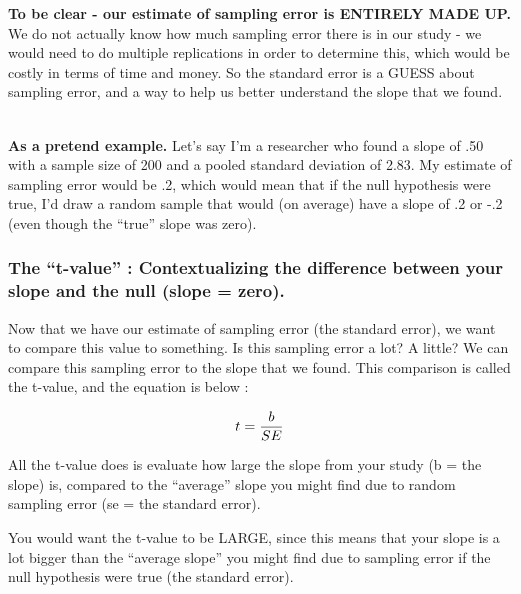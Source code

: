 \documentclass[
  letterpaper,
  DIV=11,
  numbers=noendperiod,
  oneside]{scrreprt}
\begin{document}
\textbf{To be clear - our estimate of sampling error is ENTIRELY MADE
UP.} We do not actually know how much sampling error there is in our
study - we would need to do multiple replications in order to determine
this, which would be costly in terms of time and money. So the standard
error is a GUESS about sampling error, and a way to help us better
understand the slope that we found.\\
\strut \\
\textbf{As a pretend example.} Let's say I'm a researcher who found a
slope of .50 with a sample size of 200 and a pooled standard deviation
of 2.83. My estimate of sampling error would be .2, which would mean
that if the null hypothesis were true, I'd draw a random sample that
would (on average) have a slope of .2 or -.2 (even though the ``true''
slope was zero).

\subsubsection{\texorpdfstring{\textbf{The ``t-value'' : Contextualizing
the difference between your slope and the null (slope =
zero).}}{The ``t-value'' : Contextualizing the difference between your slope and the null (slope = zero).}}\label{the-t-value-contextualizing-the-difference-between-your-slope-and-the-null-slope-zero.}

Now that we have our estimate of sampling error (the standard error), we
want to compare this value to something. Is this sampling error a lot? A
little? We can compare this sampling error to the slope that we found.
This comparison is called the t-value, and the equation is below :~

\[
\huge t = \frac{b}{SE}
\]

All the t-value does is evaluate how large the slope from your study (b
= the slope) is, compared to the ``average'' slope you might find due to
random sampling error (se = the standard error).~

\begin{tcolorbox}[enhanced jigsaw, toptitle=1mm, toprule=.15mm, rightrule=.15mm, breakable, left=2mm, colbacktitle=quarto-callout-tip-color!10!white, colback=white, opacityback=0, coltitle=black, bottomtitle=1mm, opacitybacktitle=0.6, titlerule=0mm, leftrule=.75mm, arc=.35mm, bottomrule=.15mm, title=\textcolor{quarto-callout-tip-color}{\faLightbulb}\hspace{0.5em}{Pop Quiz. As a researcher hoping to show that your slope is ``real'',
would you want the t-value to be LARGE or SMALL?}, colframe=quarto-callout-tip-color-frame]

You would want the t-value to be LARGE, since this means that your slope
is a lot bigger than the ``average slope'' you might find due to
sampling error if the null hypothesis were true (the standard error).

\end{tcolorbox}
\end{document}
